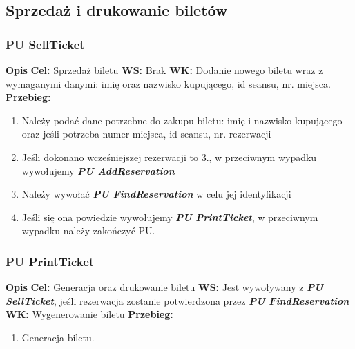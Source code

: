 \documentclass{article}
\begin{document}
	\newpage
	\subsection{Sprzedaż i drukowanie biletów}
	\subsubsection{PU SellTicket}
	\noindent \textbf{Opis }
	\newline \textbf{Cel:} Sprzedaż biletu
	\newline \textbf{WS: } Brak
	\newline \textbf{WK: } Dodanie nowego biletu wraz z wymaganymi danymi: imię oraz nazwisko kupującego, id seansu, nr. miejsca.
	\newline \textbf{Przebieg: }
	\begin{enumerate}
		\item Należy podać dane potrzebne do zakupu biletu: imię i nazwisko kupującego oraz jeśli potrzeba numer miejsca, id seansu, nr. rezerwacji
		\item Jeśli dokonano wcześniejszej rezerwacji to 3., w przeciwnym wypadku wywołujemy \textit{\textbf{PU AddReservation}}
		\item Należy wywołać \textit{\textbf{PU FindReservation}} w celu jej identyfikacji
		\item Jeśli się ona powiedzie wywołujemy \textit{\textbf{PU PrintTicket}}, w przeciwnym wypadku należy zakończyć PU.
	\end{enumerate}
	
	\subsubsection{PU PrintTicket}
	\noindent \textbf{Opis }
	\newline \textbf{Cel:} Generacja oraz drukowanie biletu
	\newline \textbf{WS:} Jest wywoływany z \textit{\textbf{PU SellTicket}}, jeśli rezerwacja zostanie potwierdzona przez \textit{\textbf{PU FindReservation}}
	\newline \textbf{WK: } Wygenerowanie biletu
	\newline \textbf{Przebieg: }
	\begin{enumerate}
		\item Generacja biletu.
	\end{enumerate}
	
\end{document}
